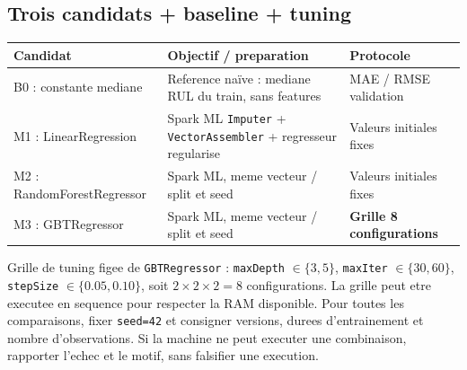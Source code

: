 \documentclass[10pt,a4paper]{article}
\newcommand{\code}[1]{{\small\ttfamily\nolinkurl{#1}}}
\begin{document}
\subsection{Trois candidats + baseline + tuning}
\begin{tabularx}{\linewidth}{@{}p{34mm}Yp{34mm}@{}}
\toprule
\textbf{Candidat} & \textbf{Objectif / preparation} & \textbf{Protocole}\\\midrule
B0 : constante mediane & Reference na\"ive : mediane RUL du train, sans features & MAE / RMSE validation\\
M1 : LinearRegression & Spark ML \code{Imputer} + \code{VectorAssembler} + regresseur regularise & Valeurs initiales fixes\\
M2 : RandomForestRegressor & Spark ML, meme vecteur / split et seed & Valeurs initiales fixes\\
M3 : GBTRegressor & Spark ML, meme vecteur / split et seed & \textbf{Grille 8 configurations}\\
\bottomrule
\end{tabularx}
Grille de tuning figee de \code{GBTRegressor} : \code{maxDepth} \(\in\{3,5\}\), \code{maxIter} \(\in\{30,60\}\), \code{stepSize} \(\in\{0.05,0.10\}\), soit \(2\times2\times2=8\) configurations. La grille peut etre executee en sequence pour respecter la RAM disponible. Pour toutes les comparaisons, fixer \code{seed=42} et consigner versions, durees d'entrainement et nombre d'observations. Si la machine ne peut executer une combinaison, rapporter l'echec et le motif, sans falsifier une execution.
\end{document}
